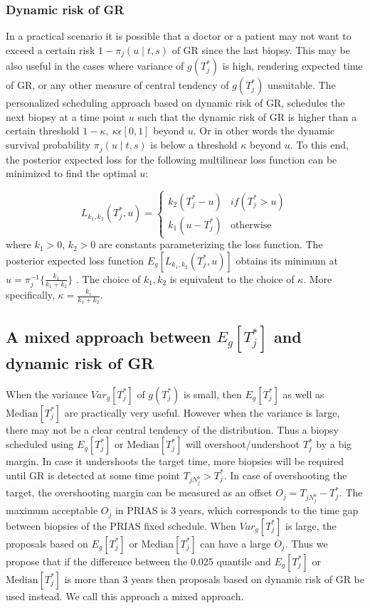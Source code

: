 \subsubsection{Dynamic risk of GR}
\label{subsubsec : dynamic_risk_definitions}
In a practical scenario it is possible that a doctor or a patient may not want to exceed a certain risk $1 - \pi_j(u \mid t, s)$ of GR since the last biopsy. This may be also useful in the cases where variance of $g(T^*_j)$ is high, rendering expected time of GR, or any other measure of central tendency of $g(T^*_j)$ unsuitable. The personalized scheduling approach based on dynamic risk of GR, schedules the next biopsy at a time point $u$ such that the dynamic risk of GR is higher than a certain threshold $1-\kappa,\ \kappa \epsilon [0,1]$ beyond $u$. Or in other words the dynamic survival probability $\pi_j(u \mid t, s)$ is below a threshold $\kappa$ beyond $u$. To this end, the posterior expected loss for the following multilinear loss function can be minimized to find the optimal $u$:

\begin{equation}
\label{eq : loss_dynamic_risk}
L_{k_1, k_2}(T^*_j, u) =
    \begin{cases}
      k_2(T^*_j-u) & if(T^*_j > u)\\
      k_1(u-T^*_j) & \text{otherwise}
    \end{cases}       
\end{equation}
where $k_1 > 0$, $k_2 > 0$ are constants parameterizing the loss function. The posterior expected loss function $E_g[L_{k_1, k_2}(T^*_j, u)]$ obtains its minimum at $u = \pi_j^{-1}\Big\{\frac{k_1}{k_1 + k_2}\Big\}$ \citep{robertBayesianChoice}. The choice of $k_1, k_2$ is equivalent to the choice of $\kappa$. More specifically, $\kappa = \frac{k_1}{k_1 + k_2}$.

\subsection{A mixed approach between $E_g[T^*_j]$ and dynamic risk of GR}
\label{subsec : mixed_approach}
When the variance $Var_g[T^*_j]$ of $g(T^*_j)$ is small, then $E_g[T^*_j]$ as well as $\text{Median}[T^*_j]$ are practically very useful. However when the variance is large, there may not be a clear central tendency of the distribution. Thus a biopsy scheduled using $E_g[T^*_j]$ or $\text{Median}[T^*_j]$ will overshoot/undershoot $T^*_j$ by a big margin. In case it undershoots the target time, more biopsies will be required until GR is detected at some time point $T_{j{N_j^b}} >  T^*_j$. In case of overshooting the target, the overshooting margin can be measured as an offset $O_j = T_{j{N_j^b}} - T_j^*$. The maximum acceptable $O_j$ in PRIAS is 3 years, which corresponds to the time gap between biopsies of the PRIAS fixed schedule. When $Var_g[T^*_j]$ is large, the proposals based on $E_g[T^*_j]$ or $\text{Median}[T^*_j]$ can have a large $O_j$. Thus we propose that if the difference between the 0.025 quantile and $E_g[T^*_j]$ or $\text{Median}[T^*_j]$ is more than 3 years then proposals based on dynamic risk of GR be used instead. We call this approach a mixed approach.

